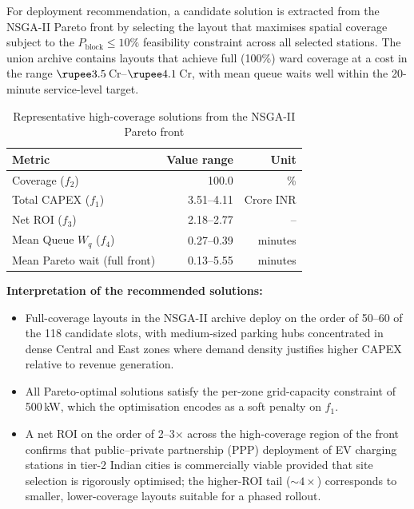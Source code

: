 For deployment recommendation, a candidate solution is extracted
from the NSGA-II Pareto front by selecting the layout that
maximises spatial coverage subject to the $P_{\text{block}} \le
10\%$ feasibility constraint across all selected stations. The
union archive contains layouts that achieve full
(100\%) ward coverage at a cost in the range
$\text{\rupee}3.5$\,Cr--$\text{\rupee}4.1$\,Cr, with mean queue
waits well within the 20-minute service-level target.

\begin{table}[H]
\centering
\caption{Representative high-coverage solutions from the NSGA-II
         Pareto front}
\label{tab:optimal}
\begin{tabular}{lrr}
\toprule
Metric & Value range & Unit \\
\midrule
Coverage ($f_2$)              & 100.0     & \%        \\
Total CAPEX ($f_1$)            & 3.51--4.11 & Crore INR \\
Net ROI ($f_3$)                & 2.18--2.77 & --        \\
Mean Queue $W_q$ ($f_4$)        & 0.27--0.39 & minutes   \\
Mean Pareto wait (full front)   & 0.13--5.55 & minutes   \\
\bottomrule
\end{tabular}
\end{table}

\textbf{Interpretation of the recommended solutions:}
\begin{itemize}
    \item Full-coverage layouts in the NSGA-II archive deploy on
          the order of 50--60 of the 118 candidate slots, with
          medium-sized parking hubs concentrated in dense Central
          and East zones where demand density justifies higher
          CAPEX relative to revenue generation.
    \item All Pareto-optimal solutions satisfy the per-zone
          grid-capacity constraint of 500\,kW, which the
          optimisation encodes as a soft penalty on $f_1$.
    \item A net ROI on the order of 2--3$\times$ across the
          high-coverage region of the front confirms that
          public--private partnership (PPP) deployment of EV
          charging stations in tier-2 Indian cities is
          commercially viable provided that site selection is
          rigorously optimised; the higher-ROI tail
          ($\sim 4\times$) corresponds to smaller, lower-coverage
          layouts suitable for a phased rollout.
\end{itemize}

